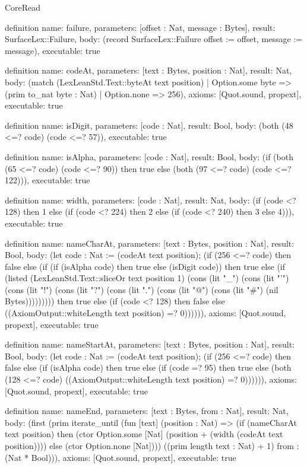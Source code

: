\begin{lexlean}{CoreRead}
\begin{semanticmodule}
definition{
  name: failure,
  parameters: [offset : Nat, message : Bytes],
  result: SurfaceLex::Failure,
  body: (record SurfaceLex::Failure {offset := offset, message := message}),
  executable: true
}

definition{
  name: codeAt,
  parameters: [text : Bytes, position : Nat],
  result: Nat,
  body: (match (LexLeanStd.Text::byteAt text position)
    | Option.some byte => (prim to_nat byte : Nat)
    | Option.none => 256),
  axioms: [Quot.sound, propext],
  executable: true
}

definition{
  name: isDigit,
  parameters: [code : Nat],
  result: Bool,
  body: (both (48 <=? code) (code <=? 57)),
  executable: true
}

definition{
  name: isAlpha,
  parameters: [code : Nat],
  result: Bool,
  body: (if (both (65 <=? code) (code <=? 90)) then true else (both (97 <=? code) (code <=? 122))),
  executable: true
}

definition{
  name: width,
  parameters: [code : Nat],
  result: Nat,
  body: (if (code <? 128) then 1 else (if (code <? 224) then 2 else (if (code <? 240) then 3 else 4))),
  executable: true
}

definition{
  name: nameCharAt,
  parameters: [text : Bytes, position : Nat],
  result: Bool,
  body: (let code : Nat := (codeAt text position); (if (256 <=? code) then false else (if (if (isAlpha code) then true else (isDigit code)) then true else (if (listed (LexLeanStd.Text::sliceOr text position 1) (cons (lit "_") (cons (lit "'") (cons (lit "!") (cons (lit "?") (cons (lit ".") (cons (lit "@") (cons (lit "#") (nil Bytes))))))))) then true else (if (code <? 128) then false else ((AxiomOutput::whiteLength text position) =? 0)))))),
  axioms: [Quot.sound, propext],
  executable: true
}

definition{
  name: nameStartAt,
  parameters: [text : Bytes, position : Nat],
  result: Bool,
  body: (let code : Nat := (codeAt text position); (if (256 <=? code) then false else (if (isAlpha code) then true else (if (code =? 95) then true else (both (128 <=? code) ((AxiomOutput::whiteLength text position) =? 0)))))),
  axioms: [Quot.sound, propext],
  executable: true
}

definition{
  name: nameEnd,
  parameters: [text : Bytes, from : Nat],
  result: Nat,
  body: (first (prim iterate_until (fun [text] (position : Nat) => (if (nameCharAt text position) then (ctor Option.some [Nat] (position + (width (codeAt text position)))) else (ctor Option.none [Nat]))) ((prim length text : Nat) + 1) from : (Nat * Bool))),
  axioms: [Quot.sound, propext],
  executable: true
}


\end{semanticmodule}
\end{lexlean}
